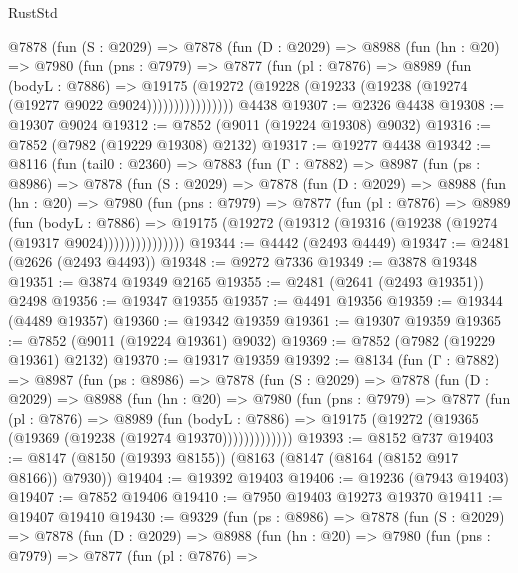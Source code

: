 \begin{lexlean}{RustStd}
\begin{coremodule}
          @7878
            (fun (S : @2029) =>
            @7878
              (fun (D : @2029) =>
              @8988
                (fun (hn : @20) =>
                @7980
                  (fun (pns : @7979) =>
                  @7877
                    (fun (pl : @7876) =>
                    @8989
                      (fun (bodyL : @7886) =>
                      @19175
                        (@19272 (@19228 (@19233 (@19238 (@19274 (@19277 @9022 @9024))))))))))))))))
    @4438
@19307 := @2326 @4438
@19308 := @19307 @9024
@19312 := @7852 (@9011 (@19224 @19308) @9032)
@19316 := @7852 (@7982 (@19229 @19308) @2132)
@19317 := @19277 @4438
@19342 := @8116
    (fun (tail0 : @2360) =>
    @7883
      (fun (Γ : @7882) =>
      @8987
        (fun (ps : @8986) =>
        @7878
          (fun (S : @2029) =>
          @7878
            (fun (D : @2029) =>
            @8988
              (fun (hn : @20) =>
              @7980
                (fun (pns : @7979) =>
                @7877
                  (fun (pl : @7876) =>
                  @8989
                    (fun (bodyL : @7886) =>
                    @19175 (@19272 (@19312 (@19316 (@19238 (@19274 (@19317 @9024)))))))))))))))
@19344 := @4442 (@2493 @4449)
@19347 := @2481 (@2626 (@2493 @4493))
@19348 := @9272 @7336
@19349 := @3878 @19348
@19351 := @3874 @19349 @2165
@19355 := @2481 (@2641 (@2493 @19351)) @2498
@19356 := @19347 @19355
@19357 := @4491 @19356
@19359 := @19344 (@4489 @19357)
@19360 := @19342 @19359
@19361 := @19307 @19359
@19365 := @7852 (@9011 (@19224 @19361) @9032)
@19369 := @7852 (@7982 (@19229 @19361) @2132)
@19370 := @19317 @19359
@19392 := @8134
    (fun (Γ : @7882) =>
    @8987
      (fun (ps : @8986) =>
      @7878
        (fun (S : @2029) =>
        @7878
          (fun (D : @2029) =>
          @8988
            (fun (hn : @20) =>
            @7980
              (fun (pns : @7979) =>
              @7877
                (fun (pl : @7876) =>
                @8989
                  (fun (bodyL : @7886) =>
                  @19175 (@19272 (@19365 (@19369 (@19238 (@19274 @19370)))))))))))))
@19393 := @8152 @737
@19403 := @8147 (@8150 (@19393 @8155)) (@8163 (@8147 (@8164 (@8152 @917 @8166)) @7930))
@19404 := @19392 @19403
@19406 := @19236 (@7943 @19403)
@19407 := @7852 @19406
@19410 := @7950 @19403 @19273 @19370
@19411 := @19407 @19410
@19430 := @9329
    (fun (ps : @8986) =>
    @7878
      (fun (S : @2029) =>
      @7878
        (fun (D : @2029) =>
        @8988
          (fun (hn : @20) =>
          @7980
            (fun (pns : @7979) =>
            @7877
              (fun (pl : @7876) =>

\end{coremodule}
\end{lexlean}
